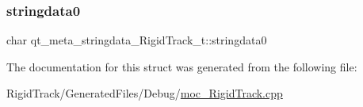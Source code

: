 \subsubsection{\texorpdfstring{stringdata0}{stringdata0}}
{\footnotesize\ttfamily char qt\+\_\+meta\+\_\+stringdata\+\_\+\+Rigid\+Track\+\_\+t\+::stringdata0}



The documentation for this struct was generated from the following file\+:\begin{DoxyCompactItemize}
\item 
Rigid\+Track/\+Generated\+Files/\+Debug/\hyperlink{_debug_2moc___rigid_track_8cpp}{moc\+\_\+\+Rigid\+Track.\+cpp}\end{DoxyCompactItemize}
